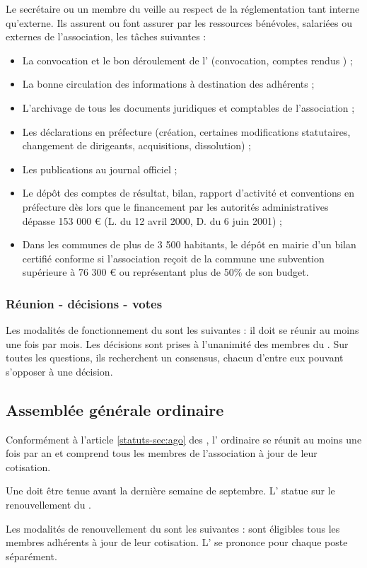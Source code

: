 \documentclass[a4paper,french,10pt]{article}
\newcommand{\article}[1]{\subsection{#1}\addtocounter{article}{1}}
\newcounter{article}
\newcommand{\artrefst}[1]{article \ref{statuts-#1} des \statuts{}}
\begin{document}
Le secrétaire ou un membre du \bureau{} veille au respect de la réglementation tant interne qu’externe. Ils assurent ou font assurer par les ressources bénévoles, salariées ou externes de l’association, les tâches suivantes :
\begin{itemize}
\item La convocation et le bon déroulement de l’\AG{} (convocation, comptes rendus ) ;
\item La bonne circulation des informations à destination des adhérents ;
\item L’archivage de tous les documents juridiques et comptables de l’association ;
\item Les déclarations en préfecture (création, certaines modifications statutaires, changement de dirigeants, acquisitions, dissolution) ;
\item Les publications au journal officiel ;
\item Le dépôt des comptes de résultat, bilan, rapport d’activité et conventions en préfecture dès lors que le financement par les autorités administratives dépasse 153 000 \euro{} (L. du 12 avril 2000, D. du 6 juin 2001) ;
\item Dans les communes de plus de 3 500 habitants, le dépôt en mairie d’un bilan certifié conforme si l’association reçoit de la commune une subvention supérieure à 76 300 \euro{} ou représentant plus de 50\% de son budget.
\end{itemize}

\subsubsection*{Réunion - décisions - votes}

Les modalités de fonctionnement du \bureau{} sont les suivantes : il
doit se réunir au moins une fois par mois. Les décisions sont
prises à l'unanimité des membres du \bureau{}. Sur toutes les questions,
ils recherchent un consensus, chacun d’entre eux pouvant s’opposer à
une décision.

\article{Assemblée générale ordinaire}
\label{sec:assembl-gener-ordin}
Conformément à l'\artrefst{sec:ago}, l’\AG{} ordinaire se réunit au moins une fois par an et comprend tous les membres de l’association à jour de leur cotisation.

Une \AG{} doit être tenue avant la dernière semaine de septembre. L'\AG{} statue sur le renouvellement du \bureau{}.

Les modalités de renouvellement du \bureau{} sont les suivantes : sont éligibles tous les membres adhérents à jour de leur cotisation. L'\AG{} se prononce pour chaque poste séparément.
\end{document}
